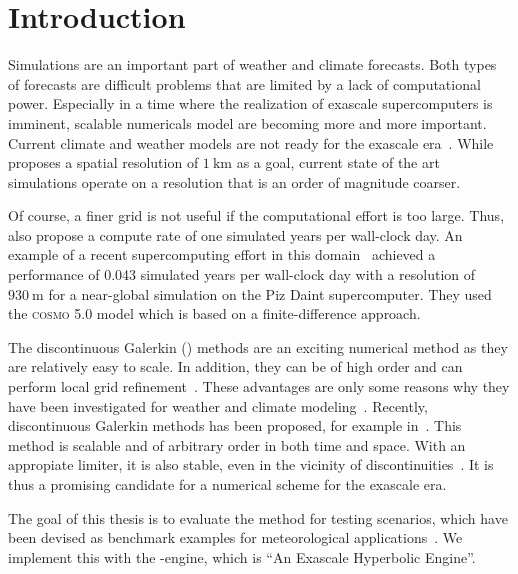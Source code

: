 \chapter{Introduction}\label{chap:introduction}
Simulations are an important part of weather and climate forecasts.
Both types of forecasts are difficult problems that are limited by a lack of computational power.
Especially in a time where the realization of exascale supercomputers is imminent, scalable numericals model are becoming more and more important.
Current climate and weather models are not ready for the exascale era~\cite{schulthess2018reflecting}.
While~\cite{schulthess2018reflecting} proposes a spatial resolution of $\SI{1}{\kilo\meter}$ as a goal, current state of the art simulations operate on a resolution that is an order of magnitude coarser.

Of course, a finer grid is not useful if the computational effort is too large.
Thus, also propose a compute rate of one simulated years per wall-clock day.
An example of a recent supercomputing effort in this domain~\cite{fuhrer2018near} achieved a performance of 0.043 simulated years per wall-clock day with a resolution of $\SI{930}{\m}$ for a near-global simulation on the Piz Daint supercomputer.
They used the \textsc{cosmo} 5.0 model which is based on a finite-difference approach.

The discontinuous Galerkin (\dg{}) methods are an exciting numerical method as they are relatively easy to scale.
In addition, they can be of high order and can perform local grid refinement~\cite{hesthaven2008nodal}.
These advantages are only some reasons why they have been investigated for weather and climate modeling~\cite{muller2010adaptive,giraldo2008study}.
Recently, \ader{} discontinuous Galerkin methods has been proposed, for example in~\cite{dumbser2008unified}.
This method is scalable and of arbitrary order in both time and space.
With an appropiate limiter, it is also stable, even in the vicinity of discontinuities~\cite{dumbser2016simple}.
It is thus a promising candidate for a numerical scheme for the exascale era.

The goal of this thesis is to evaluate the \aderdg{} method for testing scenarios, which have been devised as benchmark examples for meteorological applications~\cite{robert1993bubble,giraldo2008study}.
We implement this with the \exahype{}-engine, which is \enquote{An Exascale Hyperbolic \pde{} Engine}.

